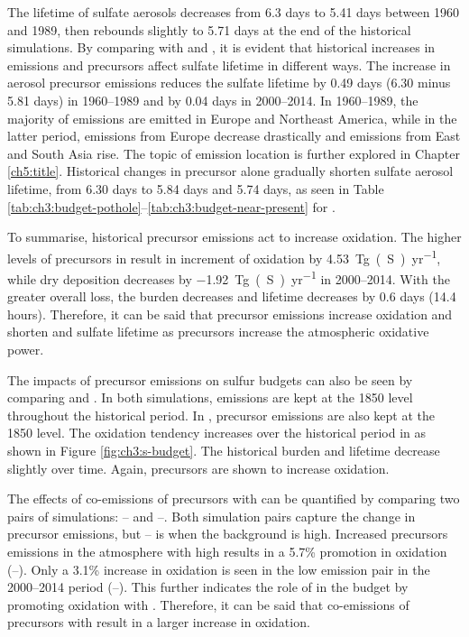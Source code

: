 The lifetime of sulfate aerosols decreases from 6.3 days to 5.41 days between 1960 and 1989, then rebounds slightly to 5.71 days at the end of the historical simulations. By comparing \sstpintcf{} with \sstpiaer{} and \sstpio{}, it is evident that historical increases in  emissions and  precursors affect sulfate lifetime in different ways. The increase in aerosol precursor emissions reduces the sulfate lifetime by 0.49 days (6.30 minus 5.81 days) in 1960--1989 and by 0.04 days in 2000--2014. In 1960--1989, the majority of  emissions are emitted in Europe and Northeast America, while in the latter period, emissions from Europe decrease drastically and emissions from East and South Asia rise. The topic of emission location is further explored in Chapter \ref{ch5:title}. Historical changes in  precursor alone gradually shorten sulfate aerosol lifetime, from 6.30 days to 5.84 days and 5.74 days, as seen in Table \ref{tab:ch3:budget-pothole}--\ref{tab:ch3:budget-near-present} for \sstpiaer{}.


To summarise, historical  precursor emissions act to increase oxidation. The higher levels of  precursors in result in increment of  oxidation by \qty{4.53}{Tg(S)~yr^{-1}}, while dry deposition decreases by \qty{-1.92}{Tg(S)~yr^{-1}} in 2000--2014. With the greater overall loss, the  burden decreases and  lifetime decreases by 0.6 days (14.4 hours). Therefore, it can be said that  precursor emissions increase  oxidation and shorten  and sulfate lifetime as  precursors increase the atmospheric oxidative power.

The impacts of  precursor emissions on sulfur budgets can also be seen by comparing \sstpiaer{} and \sstpintcf{}. In both simulations,  emissions are kept at the 1850 level throughout the historical period. In \sstpintcf{},  precursor emissions are also kept at the 1850 level. The  oxidation tendency increases over the historical period in \sstpiaer{} as shown in Figure \ref{fig:ch3:s-budget}. The historical  burden and lifetime decrease slightly over time. Again,  precursors are shown to increase  oxidation.


The effects of co-emissions of  precursors with  can be quantified by comparing two pairs of simulations: \histsst{}--\sstpio{} and \sstpiaer{}--\sstpintcf{}. Both simulation pairs capture the change in  precursor emissions, but \histsst{}--\sstpio{} is when the background  is high. Increased  precursors emissions in the atmosphere with high  results in a 5.7\% promotion in  oxidation (\histsst{}--\sstpio{}). Only a 3.1\% increase in oxidation is seen in the low  emission pair in the 2000--2014 period (\sstpiaer{}--\sstpintcf{}). This further indicates the role of  in the  budget by promoting oxidation with . Therefore, it can be said that co-emissions of  precursors with  result in a larger increase in  oxidation. 


